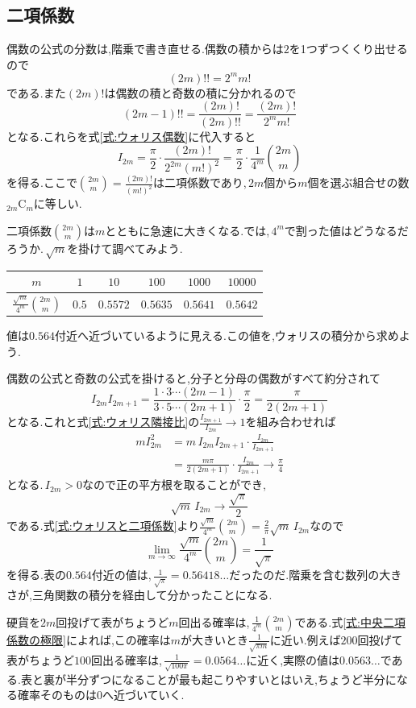 \subsection{二項係数}

偶数の公式の分数は,階乗で書き直せる.偶数の積からは$2$を1つずつくくり出せるので
\[
 (2m)!!=2^m m!
\]
である.また$(2m)!$は偶数の積と奇数の積に分かれるので
\[
 (2m-1)!!=\frac{(2m)!}{(2m)!!}=\frac{(2m)!}{2^m m!}
\]
となる.これらを式\eqref{式:ウォリス偶数}に代入すると
\begin{equation}\label{式:ウォリスと二項係数}
 I_{2m}=\frac{\pi}{2}\cdot\frac{(2m)!}{2^{2m}(m!)^2}
 =\frac{\pi}{2}\cdot\frac{1}{4^m}\binom{2m}{m}
\end{equation}
を得る.ここで$\binom{2m}{m}=\frac{(2m)!}{(m!)^2}$は二項係数であり,\,$2m$個から$m$個を選ぶ組合せの数${}_{2m}\mathrm{C}_m$に等しい.

二項係数$\binom{2m}{m}$は$m$とともに急速に大きくなる.では,\,$4^m$で割った値はどうなるだろうか.\,$\sqrt m$を掛けて調べてみよう.
\begin{center}
\begin{tabular}{cccccc}
\toprule
$m$ & $1$ & $10$ & $100$ & $1000$ & $10000$\\
\midrule
$\frac{\sqrt m}{4^m}\binom{2m}{m}$ & $0.5$ & $0.5572$ & $0.5635$ & $0.5641$ & $0.5642$\\
\bottomrule
\end{tabular}
\end{center}
値は$0.564$付近へ近づいているように見える.この値を,ウォリスの積分から求めよう.

偶数の公式と奇数の公式を掛けると,分子と分母の偶数がすべて約分されて
\[
 I_{2m}I_{2m+1}
 =\frac{1\cdot3\cdots(2m-1)}{3\cdot5\cdots(2m+1)}\cdot\frac{\pi}{2}
 =\frac{\pi}{2(2m+1)}
\]
となる.これと式\eqref{式:ウォリス隣接比}の$\frac{I_{2m+1}}{I_{2m}}\to1$を組み合わせれば
\begin{align*}
 mI_{2m}^2
 &=m\,I_{2m}I_{2m+1}\cdot\frac{I_{2m}}{I_{2m+1}}\\
 &=\frac{m\pi}{2(2m+1)}\cdot\frac{I_{2m}}{I_{2m+1}}
 \longrightarrow\frac{\pi}{4}
\end{align*}
となる.\,$I_{2m}>0$なので正の平方根を取ることができ,
\[
 \sqrt m\,I_{2m}\longrightarrow\frac{\sqrt\pi}{2}
\]
である.式\eqref{式:ウォリスと二項係数}より$\frac{\sqrt m}{4^m}\binom{2m}{m}=\frac2\pi\sqrt m\,I_{2m}$なので
\begin{equation}\label{式:中央二項係数の極限}
 \lim_{m\to\infty}\frac{\sqrt m}{4^m}\binom{2m}{m}
 =\frac1{\sqrt\pi}
\end{equation}
を得る.表の$0.564$付近の値は,\,$\frac1{\sqrt\pi}=0.56418\ldots$だったのだ.階乗を含む数列の大きさが,三角関数の積分を経由して分かったことになる.

硬貨を$2m$回投げて表がちょうど$m$回出る確率は,\,$\frac1{4^m}\binom{2m}{m}$である.式\eqref{式:中央二項係数の極限}によれば,この確率は$m$が大きいとき$\frac{1}{\sqrt{\pi m}}$に近い.例えば$200$回投げて表がちょうど$100$回出る確率は,\,$\frac1{\sqrt{100\pi}}=0.0564\ldots$に近く,実際の値は$0.0563\ldots$である.表と裏が半分ずつになることが最も起こりやすいとはいえ,ちょうど半分になる確率そのものは$0$へ近づいていく.
